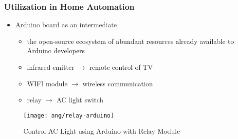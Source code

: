 
\begin{frame}
\frametitle{Utilization in Home Automation}
\begin{itemize}
	\item Arduino\textsuperscript{\textregistered} board as an intermediate
		\begin{itemize}
		\item the open-source ecosystem of abundant resources already available to Arduino developers
		\item infrared emitter $\longrightarrow$ remote control of TV
		\item WIFI module $\longrightarrow$ wireless communication
		\item relay $\longrightarrow$ AC light switch
		\end{itemize}
\end{itemize}

\begin{figure}[H]
\centering
\texttt{[image: ang/relay-arduino]}
\caption{Control AC Light using Arduino with Relay Module \cite{relay-arduino}}
\end{figure}
\end{frame}
